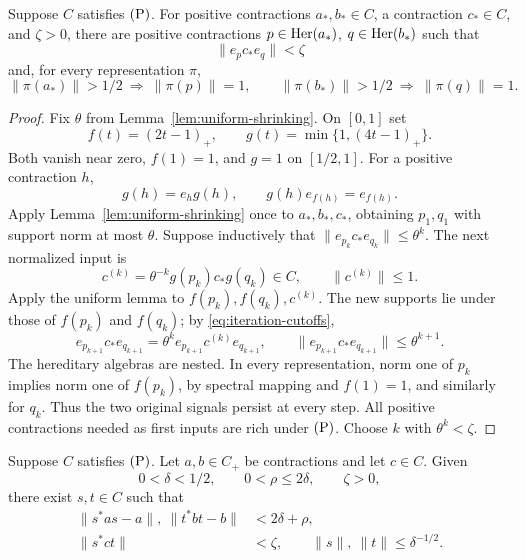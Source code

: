 \begin{proposition}
\label{prop:iterated-separation}
Suppose \(C\) satisfies \(\textup{(P)}\).  For positive contractions
\(a_*,b_*\in C\), a contraction \(c_*\in C\), and
\(\zeta>0\), there are positive contractions
\(p\in\operatorname{Her}(a_*)\), \(q\in\operatorname{Her}(b_*)\) such that
\[
 \|e_p c_*e_q\|<\zeta
\]
and, for every representation \(\pi\),
\[
 \|\pi(a_*)\|>1/2\ \Longrightarrow\ \|\pi(p)\|=1,
 \qquad
 \|\pi(b_*)\|>1/2\ \Longrightarrow\ \|\pi(q)\|=1.
\]
\end{proposition}

\begin{proof}
Fix \(\theta\) from Lemma~\ref{lem:uniform-shrinking}.
On \([0,1]\) set
\[
 f(t)=(2t-1)_+,\qquad g(t)=\min\{1,(4t-1)_+\}.
\]
Both vanish near zero, \(f(1)=1\), and \(g=1\) on
\([1/2,1]\).  For a positive contraction \(h\),
\begin{equation}\label{eq:iteration-cutoffs}
 g(h)=e_hg(h),\qquad g(h)e_{f(h)}=e_{f(h)}.
\end{equation}
Apply Lemma~\ref{lem:uniform-shrinking} once to
\(a_*,b_*,c_*\), obtaining \(p_1,q_1\) with support norm
at most \(\theta\).  Suppose inductively that
\(\|e_{p_k}c_*e_{q_k}\|\le\theta^k\).  The next normalized
input is
\begin{equation}\label{eq:iteration-normalization}
 c^{(k)}=\theta^{-k}g(p_k)c_*g(q_k)\in C,\qquad
 \|c^{(k)}\|\le1.
\end{equation}
Apply the uniform lemma to \(f(p_k),f(q_k),c^{(k)}\).
The new supports lie under those of \(f(p_k)\) and \(f(q_k)\);
by \eqref{eq:iteration-cutoffs},
\[
 e_{p_{k+1}}c_*e_{q_{k+1}}
 =\theta^k e_{p_{k+1}}c^{(k)}e_{q_{k+1}},
 \qquad
 \|e_{p_{k+1}}c_*e_{q_{k+1}}\|\le\theta^{k+1}.
\]
The hereditary algebras are nested.  In every representation,
norm one of \(p_k\) implies norm one of \(f(p_k)\), by
spectral mapping and \(f(1)=1\), and similarly for \(q_k\).
Thus the two original signals persist at every step.
All positive contractions needed as first inputs are rich under \(\textup{(P)}\).
Choose \(k\) with \(\theta^k<\zeta\).
\end{proof}

\begin{proposition}
\label{prop:bounded-diagonalization}
Suppose \(C\) satisfies \(\textup{(P)}\).  Let \(a,b\in C_+\) be
contractions and let \(c\in C\).  Given
\[
 0<\delta<1/2,\qquad 0<\rho\le2\delta,\qquad \zeta>0,
\]
there exist \(s,t\in C\) such that
\begin{align}
 \|s^*as-a\|,\ \|t^*bt-b\|&<2\delta+\rho,
 \label{eq:bounded-diagonals}\\
 \|s^*ct\|&<\zeta,\qquad
 \|s\|,\ \|t\|\le\delta^{-1/2}.
 \label{eq:bounded-cross}
\end{align}
\end{proposition}

